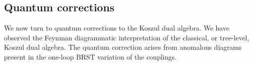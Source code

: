 \documentclass[11pt]{amsart}
\def\brian#1{{\textcolor{blue!65!red}{BRW: {#1}}}}
\begin{document}
%
%

\subsection{Quantum corrections}

We now turn to quantum corrections to the Koszul dual algebra.
We have observed the Feynman diagrammatic interpretation of the classical, or tree-level, Koszul dual algebra. 
The quantum correction arises from anomalous diagrams present in the one-loop BRST variation of the couplings. 
\end{document}
